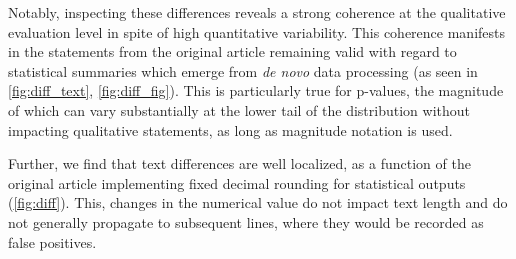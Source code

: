 Notably, inspecting these differences reveals a strong coherence at the qualitative evaluation level in spite of high quantitative variability.
This coherence manifests in the statements from the original article remaining valid with regard to statistical summaries which emerge from  \textit{de novo} data processing (as seen in \ref{fig:diff_text}, \ref{fig:diff_fig}).
This is particularly true for p-values, the magnitude of which can vary substantially at the lower tail of the distribution without impacting qualitative statements, as long as magnitude notation is used.

Further, we find that text differences are well localized, as a function of the original article implementing fixed decimal rounding for statistical outputs (\cref{fig:diff}).
This, changes in the numerical value do not impact text length and do not generally propagate to subsequent lines, where they would be recorded as false positives.


